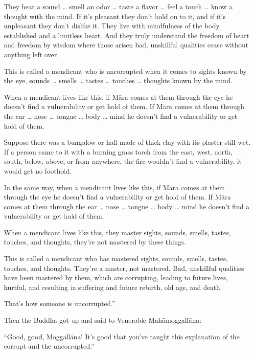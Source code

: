 \documentclass[12pt,openany]{book}%
\begin{document}
They hear a sound … smell an odor … taste a flavor … feel a touch … know a thought with the mind. If it’s pleasant they don’t hold on to it, and if it’s unpleasant they don’t dislike it. They live with mindfulness of the body established and a limitless heart. And they truly understand the freedom of heart and freedom by wisdom where those arisen bad, unskillful qualities cease without anything left over. 

This is called a mendicant who is uncorrupted when it comes to sights known by the eye, sounds … smells … tastes … touches … thoughts known by the mind. 

When a mendicant lives like this, if \textsanskrit{Māra} comes at them through the eye he doesn’t find a vulnerability or get hold of them. If \textsanskrit{Māra} comes at them through the ear … nose … tongue … body … mind he doesn’t find a vulnerability or get hold of them. 

Suppose there was a bungalow or hall made of thick clay with its plaster still wet. If a person came to it with a burning grass torch from the east, west, north, south, below, above, or from anywhere, the fire wouldn’t find a vulnerability, it would get no foothold. 

In the same way, when a mendicant lives like this, if \textsanskrit{Māra} comes at them through the eye he doesn’t find a vulnerability or get hold of them. If \textsanskrit{Māra} comes at them through the ear … nose … tongue … body … mind he doesn’t find a vulnerability or get hold of them. 

When a mendicant lives like this, they master sights, sounds, smells, tastes, touches, and thoughts, they’re not mastered by these things. 

This is called a mendicant who has mastered sights, sounds, smells, tastes, touches, and thoughts. They’re a master, not mastered. Bad, unskillful qualities have been mastered by them, which are corrupting, leading to future lives, hurtful, and resulting in suffering and future rebirth, old age, and death. 

That’s how someone is uncorrupted.” 

Then the Buddha got up and said to Venerable \textsanskrit{Mahāmoggallāna}: 

“Good, good, \textsanskrit{Moggallāna}! It’s good that you’ve taught this explanation of the corrupt and the uncorrupted.” 
\end{document}
